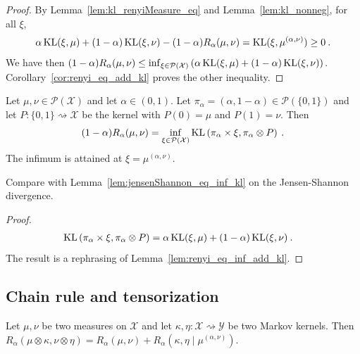 \begin{proof}
By Lemma~\ref{lem:kl_renyiMeasure_eq} and Lemma~\ref{lem:kl_nonneg}, for all $\xi$,
\begin{align*}
\alpha \operatorname{KL}(\xi, \mu) + (1 - \alpha)\operatorname{KL}(\xi, \nu) - (1 - \alpha) R_\alpha(\mu, \nu)
= \operatorname{KL}(\xi, \mu^{(\alpha, \nu)})
\ge 0 \: .
\end{align*}
We have then $(1 - \alpha) R_\alpha(\mu, \nu) \le \inf_{\xi \in \mathcal P(\mathcal X)}\left( \alpha \operatorname{KL}(\xi, \mu) + (1 - \alpha)\operatorname{KL}(\xi, \nu) \right)$.
Corollary~\ref{cor:renyi_eq_add_kl} proves the other inequality.
\end{proof}


\begin{lemma}
  \label{lem:renyi_eq_inf_kl}
  Let $\mu, \nu \in \mathcal P(\mathcal X)$ and let $\alpha \in (0, 1)$. Let $\pi_\alpha = (\alpha, 1 - \alpha) \in \mathcal P(\{0,1\})$ and let $P : \{0,1\} \rightsquigarrow \mathcal X$ be the kernel with $P(0) = \mu$ and $P(1) = \nu$. Then
  \begin{align*}
  (1 - \alpha) R_\alpha(\mu, \nu) = \inf_{\xi \in \mathcal P(\mathcal X)} \operatorname{KL}\left( \pi_\alpha \times \xi, \pi_\alpha \otimes P \right) \: .
  \end{align*}
  The infimum is attained at $\xi = \mu^{(\alpha, \nu)}$.
\end{lemma}

Compare with Lemma~\ref{lem:jensenShannon_eq_inf_kl} on the Jensen-Shannon divergence.

\begin{proof}%
{}
\begin{align*}
\operatorname{KL}\left( \pi_\alpha \times \xi, \pi_\alpha \otimes P \right)
&= \alpha \operatorname{KL}(\xi, \mu) + (1 - \alpha) \operatorname{KL}(\xi, \nu)
\: .
\end{align*}
The result is a rephrasing of Lemma~\ref{lem:renyi_eq_inf_add_kl}.
\end{proof}



\subsection{Chain rule and tensorization}

\begin{theorem}
  \label{thm:renyi_chain_rule}
  Let $\mu, \nu$ be two measures on $\mathcal X$ and let $\kappa, \eta : \mathcal X \rightsquigarrow \mathcal Y$ be two Markov kernels.
  Then $R_\alpha(\mu \otimes \kappa, \nu \otimes \eta) = R_\alpha(\mu, \nu) + R_\alpha(\kappa, \eta \mid \mu^{(\alpha, \nu)})$.
\end{theorem}

